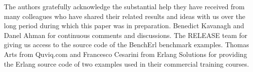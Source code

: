 \documentclass[authoryear,preprint]{sigplanconf}
\begin{document}

% 

% 
% 
% 
% 
% 
% 
% 




\acks


The authors gratefully acknowledge the substantial help they have received from 
many colleagues who have shared their related results and ideas with us over 
the long period during which this paper was in preparation.  
Benedict Kavanagh and Danel Ahman for continuous comments and discussions.
The RELEASE team for giving us access to the source code of the BenchErl 
benchmark examples.  Thomas Arts from Quviq.com and Francesco Cesarini from 
Erlang Solutions for providing the Erlang source code of two examples used in their 
commercial training courses.

\vspace{-10pt}




\end{document}
